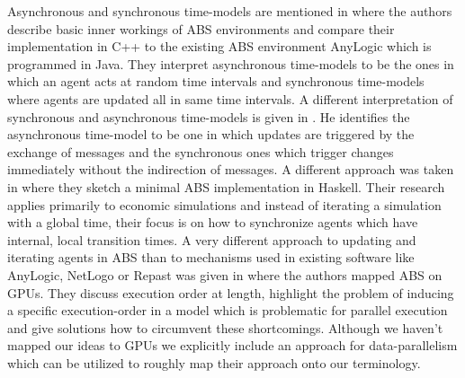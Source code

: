 Asynchronous and synchronous time-models are mentioned in \cite{dawson_opening_2014} where the authors describe basic inner workings of ABS environments and compare their implementation in C++ to the existing ABS environment AnyLogic which is programmed in Java. They interpret asynchronous time-models to be the ones in which an agent acts at random time intervals and synchronous time-models where agents are updated all in same time intervals.
A different interpretation of synchronous and asynchronous time-models is given in \cite{yuxuan_agent-based_2016}. He identifies the asynchronous time-model to be one in which updates are triggered by the exchange of messages and the synchronous ones which trigger changes immediately without the indirection of messages.
A different approach was taken in \cite{botta_time_2010} where they sketch a minimal ABS implementation in Haskell. Their research applies primarily to economic simulations and instead of iterating a simulation with a global time, their focus is on how to synchronize agents which have internal, local transition times. 
A very different approach to updating and iterating agents in ABS than to mechanisms used in existing software like AnyLogic, NetLogo or Repast was given in \cite{lysenko_framework_2008} where the authors mapped ABS on GPUs. They discuss execution order at length, highlight the problem of inducing a specific execution-order in a model which is problematic for parallel execution and give solutions how to circumvent these shortcomings. Although we haven't mapped our ideas to GPUs we explicitly include an approach for data-parallelism which can be utilized to roughly map their approach onto our terminology. 
